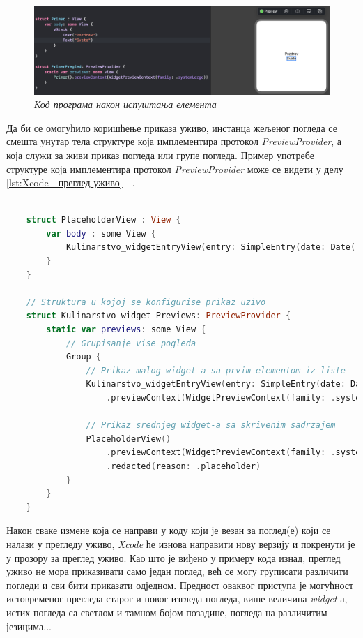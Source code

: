 \documentclass[12pt,oneside]{memoir}
\begin{document}
\begin{figure}[H]
\includegraphics[width=1\textwidth]{images/Drag_and_drop_2.png}
\centering
\caption{\textit{Код програма након испуштања елемента}}
\label{slika:d&d2}
\end{figure}

Да би се омогућило коришћење приказа уживо, инстанца жељеног погледа се смешта унутар тела структуре која имплементира протокол \textit{PreviewProvider}, а која служи за живи приказ погледа или групе погледа. Пример употребе структуре која имплементира протокол \textit{PreviewProvider} може се видети у делу \ref{lst:Xcode - преглед уживо} - .

\begin{lstlisting}[caption=\textit{{Xcode - преглед уживо}}, label={lst:Xcode - преглед уживо}, language=Swift, frame=single]
    
    struct PlaceholderView : View {
        var body : some View {
            Kulinarstvo_widgetEntryView(entry: SimpleEntry(date: Date(), configuration: ConfigurationIntent(), recipe: RecipeModel.testData[0]))
        }
    }
    
    // Struktura u kojoj se konfigurise prikaz uzivo
    struct Kulinarstvo_widget_Previews: PreviewProvider {
        static var previews: some View {
            // Grupisanje vise pogleda
            Group {
                // Prikaz malog widget-a sa prvim elementom iz liste
                Kulinarstvo_widgetEntryView(entry: SimpleEntry(date: Date(), configuration: ConfigurationIntent(), recipe: RecipeModel.testData[0]))
                    .previewContext(WidgetPreviewContext(family: .systemSmall))
                
                // Prikaz srednjeg widget-a sa skrivenim sadrzajem
                PlaceholderView()
                    .previewContext(WidgetPreviewContext(family: .systemMedium))
                    .redacted(reason: .placeholder)
            }
        }
    }    
\end{lstlisting}

\indent Након сваке измене која се направи у коду који је везан за поглед(е) који се налази у прегледу уживо, \textit{Xcode} ће изнова направити нову верзију и покренути је у прозору за преглед уживо. Као што је виђено у примеру кода изнад, преглед уживо не мора приказивати само један поглед, већ се могу груписати различити погледи и сви бити приказати одједном. Предност оваквог приступа је могућност истовременог прегледа старог и новог изгледа погледа, више величина \textit{widget}-а, истих погледа са светлом и тамном бојом позадине, погледа на различитим језицима...
\end{document}

